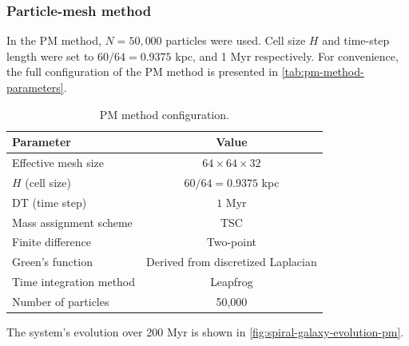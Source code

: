 \subsubsection{Particle-mesh method}
In the PM method, $N=50{,}000$ particles were used.
Cell size $H$ and time-step length were set to $60/64=0.9375$ kpc, and 1 Myr respectively.
For convenience, the full configuration of the PM method is presented in \autoref{tab:pm-method-parameters}.
\begin{table}[htp]
    \centering
    \begin{tabular}{|l|c|}
        \hline
        \textbf{Parameter}      & \textbf{Value}                     \\
        \hline
        Effective mesh size     & $64 \times 64 \times 32$           \\
        $H$ (cell size)         & $60/64=0.9375$ kpc                 \\
        DT (time step)          & $1$ Myr                            \\
        Mass assignment scheme  & TSC                                \\
        Finite difference       & Two-point                          \\
        Green's function        & Derived from discretized Laplacian \\
        Time integration method & Leapfrog                           \\
        Number of particles     & 50,000                             \\
        \hline
    \end{tabular}
    \caption{PM method configuration.}
    \label{tab:pm-method-parameters}
\end{table}
The system's evolution over 200 Myr is shown in \autoref{fig:spiral-galaxy-evolution-pm}.

